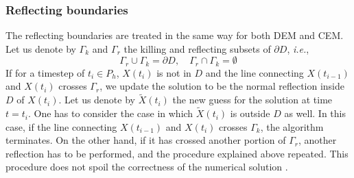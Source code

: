 \subsubsection{Reflecting boundaries}
The reflecting boundaries are treated in the same way for both DEM and CEM. Let us denote by $\Gamma_k$ and $\Gamma_r$ the killing and reflecting subsets of $\partial D$, \textit{i.e.},
\begin{equation}\label{eq:Boundaries}
	\Gamma_r \cup \Gamma_k = \partial D, \quad \Gamma_r \cap \Gamma_k = \emptyset
\end{equation} 
If for a timestep of $t_i \in P_h$, $X(t_i)$ is not in $D$ and the line connecting $X(t_{i-1})$ and $X(t_{i})$ crosses $\Gamma_r$, we update the solution to be the normal reflection inside $D$ of $X(t_i)$. Let us denote by $\tilde X(t_i)$ the new guess for the solution at time $t = t_i$. One has to consider the case in which $\tilde X(t_i)$ is outside $D$ as well. In this case, if the line connecting $X(t_{i-1})$ and $X(t_i)$ crosses $\Gamma_k$, the algorithm terminates. On the other hand, if it has crossed another portion of $\Gamma_r$, another reflection has to be performed, and the procedure explained above repeated. This procedure does not spoil the correctness of the numerical solution \cite{Helmuth}.



